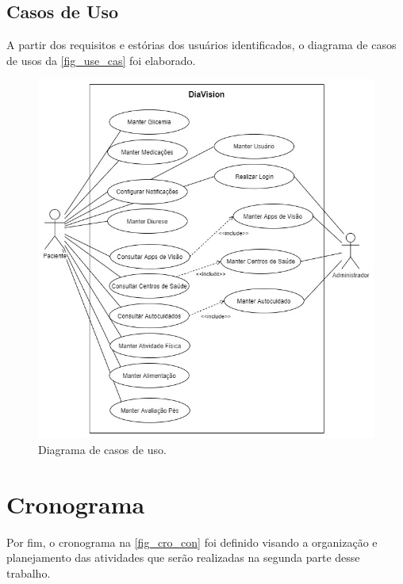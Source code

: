 \newpage

\subsection{Casos de Uso}

A partir dos requisitos e estórias dos usuários identificados, o diagrama de casos de usos da \autoref{fig_use_cas} foi elaborado.

\begin{figure}[htb]
    \caption{\label{fig_use_cas}Diagrama de casos de uso.}
    \begin{center}
        \includegraphics[scale=0.65]{Imagens/proposta/use_case.jpg}
    \end{center}
\end{figure}

\newpage

\section{Cronograma}

Por fim, o cronograma na \autoref{fig_cro_con} foi definido visando a organização e planejamento das atividades que serão realizadas
na segunda parte desse trabalho.


